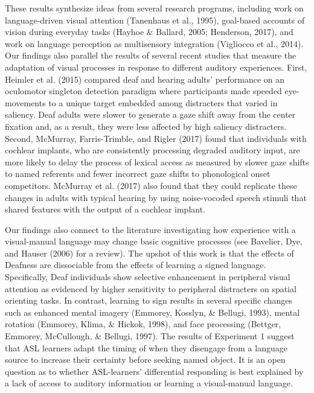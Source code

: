 \documentclass[,man,floatsintext]{apa6}
\begin{document}
These results synthesize ideas from several research programs, including work on language-driven visual attention (Tanenhaus et al., 1995), goal-based accounts of vision during everyday tasks (Hayhoe \& Ballard, 2005; Henderson, 2017), and work on language perception as multisensory integration (Vigliocco et al., 2014). Our findings also parallel the results of several recent studies that measure the adaptation of visual processes in response to different auditory experiences. First, Heimler et al. (2015) compared deaf and hearing adults' performance on an oculomotor singleton detection paradigm where participants made speeded eye-movements to a unique target embedded among distracters that varied in saliency. Deaf adults were slower to generate a gaze shift away from the center fixation and, as a result, they were less affected by high saliency distracters. Second, McMurray, Farris-Trimble, and Rigler (2017) found that individuals with cochlear implants, who are consistently processing degraded auditory input, are more likely to delay the process of lexical access as measured by slower gaze shifts to named referents and fewer incorrect gaze shifts to phonological onset competitors. McMurray et al. (2017) also found that they could replicate these changes in adults with typical hearing by using noise-vocoded speech stimuli that shared features with the output of a cochlear implant.

Our findings also connect to the literature investigating how experience with a visual-manual language may change basic cognitive processes (see Bavelier, Dye, and Hauser (2006) for a review). The upshot of this work is that the effects of Deafness are dissociable from the effects of learning a signed language. Specifically, Deaf individuals show selective enhancement in peripheral visual attention as evidenced by higher sensitivity to peripheral distracters on spatial orienting tasks. In contrast, learning to sign results in several specific changes such as enhanced mental imagery (Emmorey, Kosslyn, \& Bellugi, 1993), mental rotation (Emmorey, Klima, \& Hickok, 1998), and face processing (Bettger, Emmorey, McCullough, \& Bellugi, 1997). The results of Experiment 1 suggest that ASL learners adapt the timing of when they disengage from a language source to increase their certainty before seeking named object. It is an open question as to whether ASL-learners' differential responding is best explained by a lack of access to auditory information or learning a visual-manual language.
\end{document}
